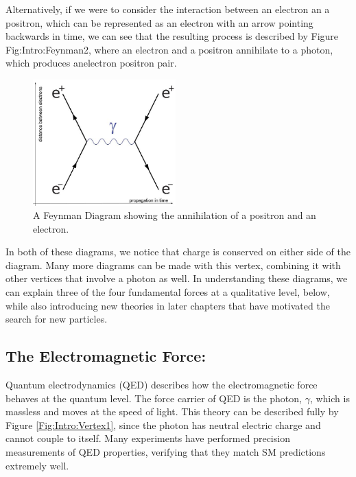Alternatively, if we were to consider the interaction between an electron an a positron, which can be represented as an electron with an arrow pointing backwards in time, we can see that the resulting process is described by Figure {Fig:Intro:Feynman2}, where an electron and a positron annihilate to a photon, which produces anelectron positron pair.
\begin{figure}[h]
    \centering
        \includegraphics[width=0.49\textwidth]{F1/FeynDiag2}
        \caption{A Feynman Diagram showing the annihilation of a positron and an electron.}
        \label{Fig:Intro:Feynman2}
\end{figure}
In both of these diagrams, we notice that charge is conserved on either side of the diagram. Many more diagrams can be made with this vertex, combining it with other vertices that involve a photon as well. In understanding these diagrams, we can explain three of the four fundamental forces at a qualitative level, below, while also introducing new theories in later chapters that have motivated the search for new particles.

\subsection{The Electromagnetic Force:}
Quantum electrodynamics (QED) describes how the electromagnetic force behaves at the quantum level. The force carrier of QED is the photon, $\gamma$, which is massless and moves at the speed of light. This theory can be described fully by Figure \ref{Fig:Intro:Vertex1}, since the photon has neutral electric charge and cannot couple to itself. Many experiments have performed precision measurements of QED properties, verifying that they match SM predictions extremely well.

